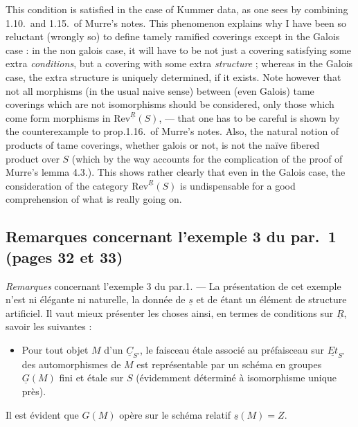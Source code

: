 \documentclass[11pt,a4paper]{article}
\begin{document}
This condition is satisfied in the case of Kummer data, as one sees by
combining 1.10.\ and 1.15.\ of Murre's notes. This phenomenon explains why I
have been so reluctant (wrongly so) to define  tamely ramified
coverings except in the Galois case : in the non galois case, it will have to
be not just a covering satisfying some extra \emph{conditions}, but a covering
with some extra \emph{structure} ; whereas in the Galois case, the extra
structure is uniquely determined, if it exists. Note however that \struck{\ill{}}
not all morphisms (in the usual naive sense) between (even Galois) tame
coverings which are not isomorphisms should be considered, only those which
come form morphisms in $\mathrm{Rev}^{\underline{R}}(S)$, --- that one has to
be careful is shown by the counterexample to prop.1.16.\ of Murre's notes.
Also, the natural notion of products of tame \struck{\ill{}} coverings, whether
galois or not, is not the naïve fibered product over $S$ (which by the way
accounts for the complication of the proof of Murre's lemma 4.3.). This shows
rather clearly that even in the Galois case, the consideration of the category
$\mathrm{Rev}^{\underline{R}}(S)$ is undispensable for a good comprehension of
what is really going on.

\subsection*{Remarques concernant l'exemple 3 du par.\ 1 (pages 32 et 33)}

\emph{Remarques} concernant l'exemple 3 du par.1. --- La présentation de cet
exemple n'est ni élégante ni naturelle, la donnée de $\underline{s}$ et de
\ill{} étant un élément de structure artificiel. Il vaut mieux présenter les
choses ainsi, en termes de conditions sur $\underline{R}$, savoir les
suivantes :

\begin{itemize}
\item[a)] Pour tout objet $M$ d'un $\underline{C}_{S'}$, le faisceau étale
associé au préfaisceau sur $\underline{Et}_{S'}$ des automorphismes de $M$ est
\struck{\ill{}} représentable par un schéma en groupes $\underline{G}(M)$ fini
et étale sur $S$ (évidemment déterminé à isomorphisme unique près).
\end{itemize}

Il est évident que $G(M)$ opère sur le schéma relatif $\underline{s}(M) = Z$.
\end{document}
